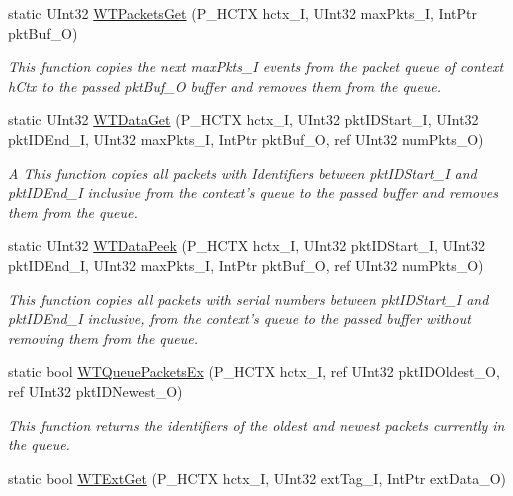 \begin{DoxyCompactItemize}
static UInt32 \hyperlink{class_wintab_d_n_1_1_c_wintab_funcs_ade1a359871fe9dd02ec2f3dd593cf7fa}{WTPacketsGet} (P\_\-HCTX hctx\_\-I, UInt32 maxPkts\_\-I, IntPtr pktBuf\_\-O)
\begin{DoxyCompactList}\small\item\em This function copies the next maxPkts\_\-I events from the packet queue of context hCtx to the passed pktBuf\_\-O buffer and removes them from the queue. \item\end{DoxyCompactList}\item 
static UInt32 \hyperlink{class_wintab_d_n_1_1_c_wintab_funcs_a63cd6d8f13c3c19bd8b30567e02829ac}{WTDataGet} (P\_\-HCTX hctx\_\-I, UInt32 pktIDStart\_\-I, UInt32 pktIDEnd\_\-I, UInt32 maxPkts\_\-I, IntPtr pktBuf\_\-O, ref UInt32 numPkts\_\-O)
\begin{DoxyCompactList}\small\item\em A This function copies all packets with Identifiers between pktIDStart\_\-I and pktIDEnd\_\-I inclusive from the context's queue to the passed buffer and removes them from the queue. \item\end{DoxyCompactList}\item 
static UInt32 \hyperlink{class_wintab_d_n_1_1_c_wintab_funcs_ad9c542ad221c675184a066a688ab7e84}{WTDataPeek} (P\_\-HCTX hctx\_\-I, UInt32 pktIDStart\_\-I, UInt32 pktIDEnd\_\-I, UInt32 maxPkts\_\-I, IntPtr pktBuf\_\-O, ref UInt32 numPkts\_\-O)
\begin{DoxyCompactList}\small\item\em This function copies all packets with serial numbers between pktIDStart\_\-I and pktIDEnd\_\-I inclusive, from the context's queue to the passed buffer without removing them from the queue. \item\end{DoxyCompactList}\item 
static bool \hyperlink{class_wintab_d_n_1_1_c_wintab_funcs_a3b797a5a70f68096c43b7d0e8088c4c3}{WTQueuePacketsEx} (P\_\-HCTX hctx\_\-I, ref UInt32 pktIDOldest\_\-O, ref UInt32 pktIDNewest\_\-O)
\begin{DoxyCompactList}\small\item\em This function returns the identifiers of the oldest and newest packets currently in the queue. \item\end{DoxyCompactList}\item 
static bool \hyperlink{class_wintab_d_n_1_1_c_wintab_funcs_a83cfeb6f7c4c5e69093a1f475b68d526}{WTExtGet} (P\_\-HCTX hctx\_\-I, UInt32 extTag\_\-I, IntPtr extData\_\-O)

\end{DoxyCompactItemize}
